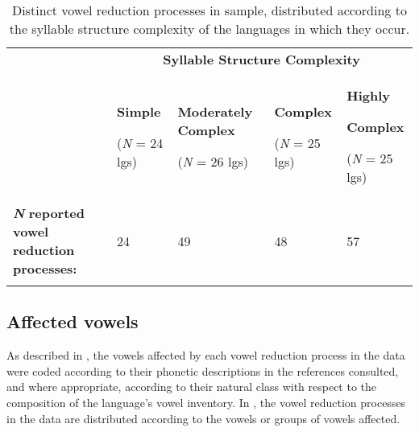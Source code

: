 \begin{table}
\begin{tabularx}{\textwidth}{XXXXX}
\lsptoprule
 & \multicolumn{4}{c}{ \textbf{Syllable Structure Complexity}}\\
& { \textbf{Simple}}

 (\textit{N} = 24 lgs) & { \textbf{Moderately Complex}}

 (\textit{N} = 26 lgs) & { \textbf{Complex}}

 (\textit{N} = 25 lgs) & { \textbf{Highly} }

{ \textbf{Complex}}

 (\textit{N} = 25 lgs)\\
 \textbf{\textit{N}} \textbf{reported vowel reduction processes:} & 24 & 49 & 48 & 57\\
\lspbottomrule
\end{tabularx}
\caption{\label{tab:6.3}Distinct vowel reduction processes in sample, distributed according to the syllable structure complexity of the languages in which they occur.}
\end{table}

\subsection{Affected vowels}\label{sec:6.3.3}

  As described in , the vowels affected by each vowel reduction process in the data were coded according to their phonetic descriptions in the references consulted, and where appropriate, according to their natural class with respect to the composition of the language’s vowel inventory. In , the vowel reduction processes in the data are distributed according to the vowels or groups of vowels affected.

